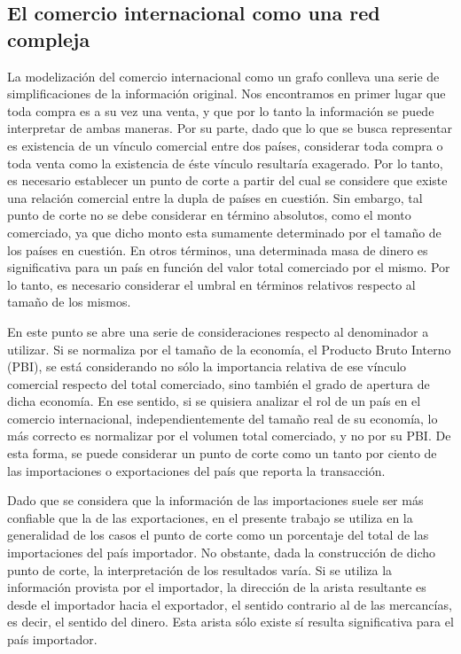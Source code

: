\documentclass[a4paper]{article}
\begin{document}
\subsection{El comercio internacional como una red compleja}

La modelización del comercio internacional como un grafo conlleva una serie de simplificaciones de la información original. Nos encontramos en primer lugar que toda compra es a su vez una venta, y que por lo tanto la información se puede interpretar de ambas maneras. Por su parte, dado que lo que se busca representar es existencia de un vínculo comercial entre dos países, considerar toda compra o toda venta como la existencia de éste vínculo resultaría exagerado. Por lo tanto, es necesario establecer un punto de corte a partir del cual se considere que existe una relación comercial entre la dupla de países en cuestión. Sin embargo, tal punto de corte no se debe considerar en término absolutos, como el monto comerciado, ya que dicho monto esta sumamente determinado por el tamaño de los países en cuestión. En otros términos, una determinada masa de dinero es significativa para un país en función del valor total comerciado por el mismo. Por lo tanto, es necesario considerar el umbral en términos relativos respecto al tamaño de los mismos.

En este punto se abre una serie de consideraciones respecto al denominador a utilizar. Si se normaliza por el tamaño de la economía, el Producto Bruto Interno (PBI), se está considerando no sólo la importancia relativa de ese vínculo comercial respecto del total comerciado, sino también el grado de apertura de dicha economía. En ese sentido, si se quisiera analizar el rol de un país en el comercio internacional, independientemente del tamaño real de su economía, lo más correcto es normalizar por el volumen total comerciado, y no por su PBI. De esta forma, se puede considerar un punto de corte como un tanto por ciento de las importaciones o exportaciones del país que reporta la transacción.

Dado que se considera que la información de las importaciones suele ser más confiable que la de las exportaciones\cite{Fan2014}, en el presente trabajo se utiliza en la generalidad de los casos el punto de corte como un porcentaje del total de las importaciones del país importador. No obstante, dada la construcción de dicho punto de corte, la interpretación de los resultados varía. Si se utiliza la información provista por el importador, la dirección de la arista resultante es desde el importador hacia el exportador, el sentido contrario al de las mercancías, es decir, el sentido del dinero. Esta arista sólo existe sí resulta significativa para el país importador.     
\end{document}
